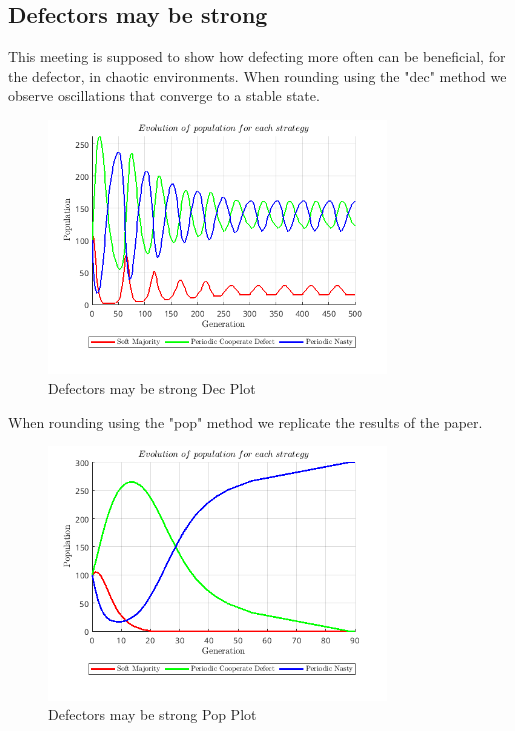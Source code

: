 \documentclass[12pt]{article}
\begin{document}
\subsection{Defectors may be strong}
This meeting is supposed to show how defecting more often can be beneficial, for the defector, in chaotic environments. When rounding using the "dec" method we observe oscillations that converge to a stable state. 
\begin{figure}[H]
    \centering
    \includegraphics[width=0.8\textwidth]{media/defectors_may_be_strong_dec.png}
    \caption{Defectors may be strong Dec Plot}
\end{figure}
When rounding using the "pop" method we replicate the results of the paper.
\begin{figure}[H]
    \centering
    \includegraphics[width=0.8\textwidth]{media/defectors_may_be_strong_pop.png}
    \caption{Defectors may be strong Pop Plot}
\end{figure}
\end{document}
